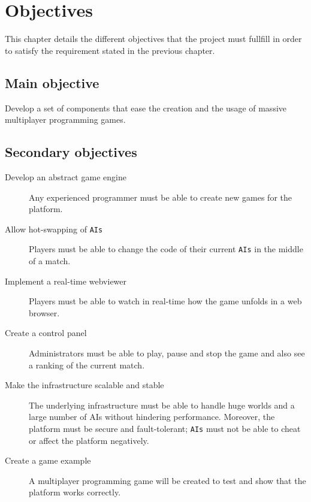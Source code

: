 \documentclass[a4paper,11pt,titlepage,abstract,numbers=noenddot,automark,mnsy,intlimits,rgb,dvipsnames]{report}
\begin{document}
\chapter{Objectives}
\label{specification}
This chapter details the different objectives that the project must fullfill in order to satisfy the requirement stated in
the previous chapter.
\section{Main objective}
Develop a set of components that ease the creation and the usage of massive multiplayer programming games.
\section{Secondary objectives}
\label{secondary_objectives}
\begin{description}
\item[Develop an abstract game engine]
Any experienced programmer must be able to create new games for the platform.
\item[Allow hot-swapping of \texttt{AIs}]
Players must be able to change the code of their current \texttt{AIs} in the middle of a match.
\item[Implement a real-time webviewer]
Players must be able to watch in real-time how the game unfolds in a web browser.
\item[Create a control panel]
Administrators must be able to play, pause and stop the game and also see a ranking of the current match.
\item[Make the infrastructure scalable and stable]
The underlying infrastructure must be able to handle huge worlds and a large number of \texttt{}AI\texttt{}s without
  hindering performance. Moreover, the platform must be secure and fault-tolerant; \texttt{AIs} must not be able to cheat
  or affect the platform negatively.
\item[Create a game example]
A multiplayer programming game will be created to test and show that the platform works correctly.
\end{description}
\clearpage
\end{document}
